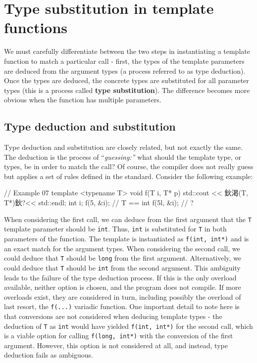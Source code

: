 \section{Type substitution in template functions}

We must carefully differentiate between the two steps in instantiating a template function to match a particular call - first, the types of the template parameters are deduced from the argument types (a process referred to as type deduction). Once the types are deduced, the concrete types are substituted for all parameter types (this is a process called \textbf{type substitution}). The difference becomes more obvious when the function has multiple parameters.

\subsection{Type deduction and substitution}

Type deduction and substitution are closely related, but not exactly the same. The deduction is the process of ``\emph{guessing:''} what should the template type, or types, be in order to match the call? Of course, the compiler does not really guess but applies a set of rules defined in the standard. Consider the following example:

\begin{code}
// Example 07
template <typename T>
void f(T i, T* p) { std::cout << 鈥渇(T, T*)鈥?<< std::endl; }
int i;
f(5, &i);    // T == int
f(5l, &i);    // ?
\end{code}

When considering the first call, we can deduce from the first argument that the \texttt{T} template parameter should be \texttt{int}. Thus, \texttt{int} is substituted for \texttt{T} in both parameters of the function. The template is instantiated as \texttt{f(int,\ int*)} and is an exact match for the argument types. When considering the second call, we could deduce that \texttt{T} should be \texttt{long} from the first argument. Alternatively, we could deduce that \texttt{T} should be \texttt{int} from the second argument. This ambiguity leads to the failure of the type deduction process. If this is the only overload available, neither option is chosen, and the program does not compile. If more overloads exist, they are considered in turn, including possibly the overload of last resort, the \texttt{f(...)} variadic function. One important detail to note here is that conversions are not considered when deducing template types - the deduction of \texttt{T} as \texttt{int} would have yielded \texttt{f(int,\ int*)} for the second call, which is a viable option for calling \texttt{f(long,\ int*)} with the conversion of the first argument. However, this option is not considered at all, and instead, type deduction fails as ambiguous.

